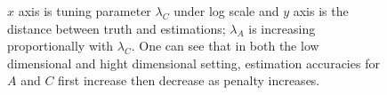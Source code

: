 \documentclass[times,twocolumn,final,authoryear]{elsarticle}
\begin{document}
\begin{figure}
\centering
{}
\caption{$x$ axis is tuning parameter $\lambda_C$ under log scale and $y$ axis is the distance between truth and estimations; $\lambda_A$ is increasing proportionally with $\lambda_C$. One can see that in both the low dimensional and hight dimensional setting, estimation accuracies for $A$ and $C$ first increase then decrease as penalty increases.}
\label{fig:low-high-d-sim}
\end{figure}
\end{document}
